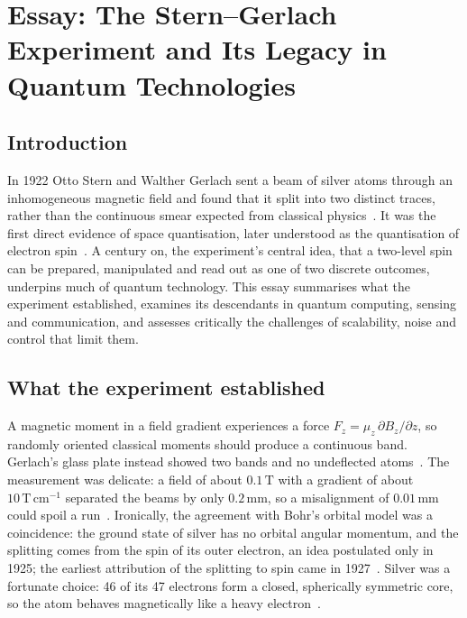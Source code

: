 \documentclass[12pt]{article}
\begin{document}
\newpage
\section{Essay: The Stern--Gerlach Experiment and Its Legacy in Quantum Technologies}

\subsection{Introduction}

In 1922 Otto Stern and Walther Gerlach sent a beam of silver atoms through an inhomogeneous magnetic field and found that it split into two distinct traces, rather than the continuous smear expected from classical physics~\cite{gerlach1922,bauer2023}. It was the first direct evidence of space quantisation, later understood as the quantisation of electron spin~\cite{friedrich2003,schmidt2016}. A century on, the experiment's central idea, that a two-level spin can be prepared, manipulated and read out as one of two discrete outcomes, underpins much of quantum technology. This essay summarises what the experiment established, examines its descendants in quantum computing, sensing and communication, and assesses critically the challenges of scalability, noise and control that limit them.

\subsection{What the experiment established}

A magnetic moment in a field gradient experiences a force $F_z=\mu_z\,\partial B_z/\partial z$, so randomly oriented classical moments should produce a continuous band. Gerlach's glass plate instead showed two bands and no undeflected atoms~\cite{bauer2023}. The measurement was delicate: a field of about $0.1\,\mathrm{T}$ with a gradient of about $10\,\mathrm{T\,cm^{-1}}$ separated the beams by only $0.2\,\mathrm{mm}$, so a misalignment of $0.01\,\mathrm{mm}$ could spoil a run~\cite{friedrich2003}. Ironically, the agreement with Bohr's orbital model was a coincidence: the ground state of silver has no orbital angular momentum, and the splitting comes from the spin of its outer electron, an idea postulated only in 1925; the earliest attribution of the splitting to spin came in 1927~\cite{friedrich2003}. Silver was a fortunate choice: 46 of its 47 electrons form a closed, spherically symmetric core, so the atom behaves magnetically like a heavy electron~\cite{lecture6}.
\end{document}

